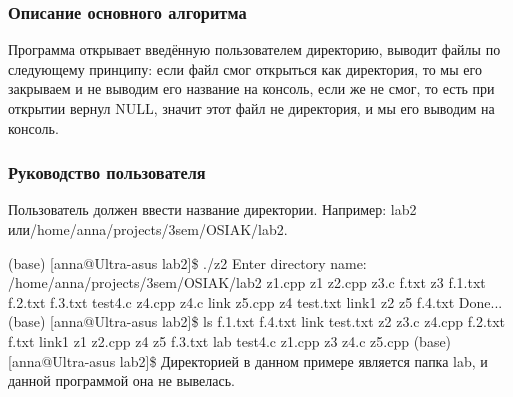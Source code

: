 \documentclass[a4paper,12pt]{extarticle}
\begin{document}
\subsubsection{Описание основного алгоритма}
Программа открывает введённую пользователем директорию, выводит файлы по следующему принципу: если файл смог открыться как директория, то мы его закрываем и не выводим его название на консоль, если же не смог, то есть при открытии вернул NULL, значит этот файл не директория, и мы его выводим на консоль.

\subsubsection{Руководство пользователя}
Пользователь должен ввести название директории. Например: lab2 или\newline /home/anna/projects/3sem/OSIAK/lab2.


(base) [anna@Ultra-asus lab2]\$ ./z2\newline
Enter directory name: /home/anna/projects/3sem/OSIAK/lab2\newline
z1.cpp\newline
z1\newline
z2.cpp\newline
z3.c\newline
f.txt\newline
z3\newline
f.1.txt\newline
f.2.txt\newline
f.3.txt\newline
test4.c\newline
z4.cpp\newline
z4.c\newline
link\newline
z5.cpp\newline
z4\newline
test.txt\newline
link1\newline
z2\newline
z5\newline
f.4.txt\newline
Done...\newline
(base) [anna@Ultra-asus lab2]\$ ls\newline
f.1.txt  f.4.txt  link     test.txt  z2      z3.c  z4.cpp\newline
f.2.txt  f.txt    link1    z1        z2.cpp  z4    z5\newline
f.3.txt  lab      test4.c  z1.cpp    z3      z4.c  z5.cpp\newline
(base) [anna@Ultra-asus lab2]\$\newline
Директорией в данном примере является папка lab, и данной программой она не вывелась.
\end{document}
